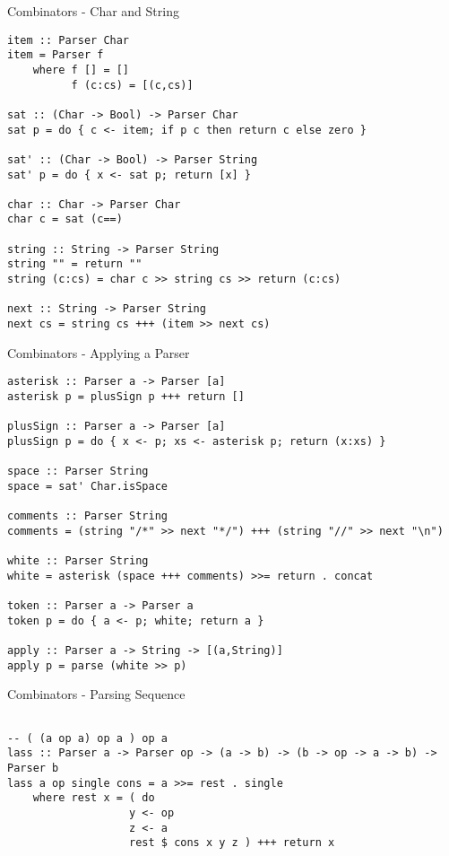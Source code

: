 \documentclass[12pt]{beamer}
\newcommand{\codesize}{\fontsize{7.7}{7.7}}
\begin{document}
\begin{spacing}{1.3}
\begin{frame}[fragile=singleslide]{Combinators - Char and String}

\begin{verbatim}
item :: Parser Char
item = Parser f
    where f [] = []
          f (c:cs) = [(c,cs)]

sat :: (Char -> Bool) -> Parser Char
sat p = do { c <- item; if p c then return c else zero }

sat' :: (Char -> Bool) -> Parser String
sat' p = do { x <- sat p; return [x] }

char :: Char -> Parser Char
char c = sat (c==)

string :: String -> Parser String
string "" = return ""
string (c:cs) = char c >> string cs >> return (c:cs)

next :: String -> Parser String
next cs = string cs +++ (item >> next cs)
\end{verbatim}
\end{frame}

\begin{frame}[fragile=singleslide]{Combinators - Applying a Parser}

\begin{verbatim}
asterisk :: Parser a -> Parser [a]
asterisk p = plusSign p +++ return []

plusSign :: Parser a -> Parser [a]
plusSign p = do { x <- p; xs <- asterisk p; return (x:xs) }

space :: Parser String
space = sat' Char.isSpace

comments :: Parser String
comments = (string "/*" >> next "*/") +++ (string "//" >> next "\n")

white :: Parser String
white = asterisk (space +++ comments) >>= return . concat

token :: Parser a -> Parser a
token p = do { a <- p; white; return a }

apply :: Parser a -> String -> [(a,String)]
apply p = parse (white >> p)
\end{verbatim}
\end{frame}

\begin{frame}[fragile=singleslide]{Combinators - Parsing Sequence}
\begin{verbatim}

-- ( (a op a) op a ) op a
lass :: Parser a -> Parser op -> (a -> b) -> (b -> op -> a -> b) -> Parser b
lass a op single cons = a >>= rest . single
    where rest x = ( do
                   y <- op
                   z <- a
                   rest $ cons x y z ) +++ return x


\end{verbatim}
\end{frame}
\end{spacing}
\end{document}
